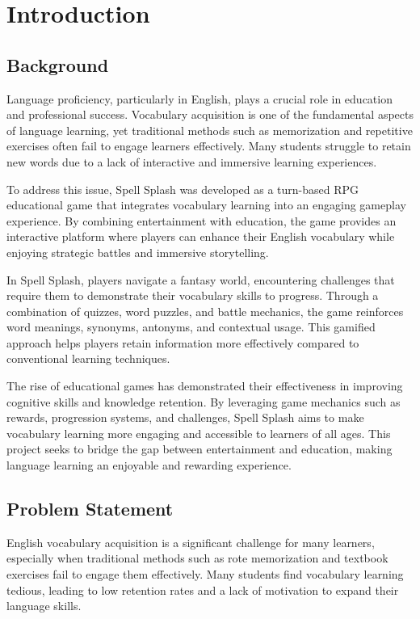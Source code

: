 \chapter{Introduction}
\label{chap:introduction}

\section{Background}
\label{section:background}


Language proficiency, particularly in English, plays a crucial role in education and professional success. Vocabulary acquisition is one of the fundamental aspects of language learning, yet traditional methods such as memorization and repetitive exercises often fail to engage learners effectively. Many students struggle to retain new words due to a lack of interactive and immersive learning experiences.


To address this issue, Spell Splash was developed as a turn-based RPG educational game that integrates vocabulary learning into an engaging gameplay experience. By combining entertainment with education, the game provides an interactive platform where players can enhance their English vocabulary while enjoying strategic battles and immersive storytelling.


In Spell Splash, players navigate a fantasy world, encountering challenges that require them to demonstrate their vocabulary skills to progress. Through a combination of quizzes, word puzzles, and battle mechanics, the game reinforces word meanings, synonyms, antonyms, and contextual usage. This gamified approach helps players retain information more effectively compared to conventional learning techniques.


The rise of educational games has demonstrated their effectiveness in improving cognitive skills and knowledge retention. By leveraging game mechanics such as rewards, progression systems, and challenges, Spell Splash aims to make vocabulary learning more engaging and accessible to learners of all ages. This project seeks to bridge the gap between entertainment and education, making language learning an enjoyable and rewarding experience.

\section{Problem Statement}
\label{section:problem-statement}

English vocabulary acquisition is a significant challenge for many learners, especially when traditional methods such as rote memorization and textbook exercises fail to engage them effectively. Many students find vocabulary learning tedious, leading to low retention rates and a lack of motivation to expand their language skills.


